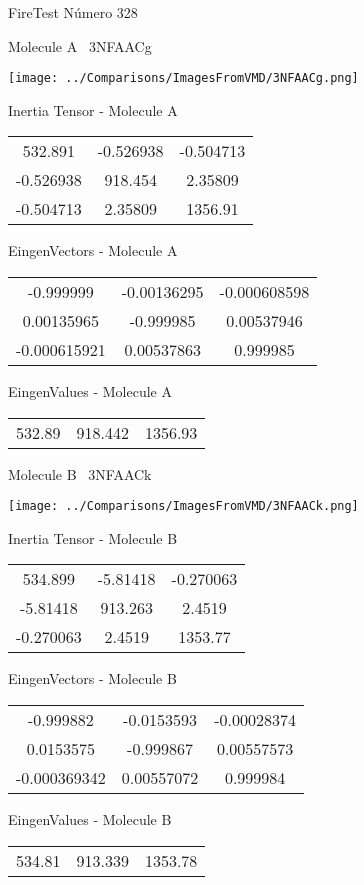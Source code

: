 \vtab[-3cm]
\begin{center}
{\large FireTest \tab Número 328}
\end{center}
\begin{multicols}{2}
\begin{center}

Molecule A \
3NFAACg

\texttt{[image: ../Comparisons/ImagesFromVMD/3NFAACg.png]}

Inertia Tensor - Molecule A \\
\begin{tabular}{|c c c|}
532.891	 & 	-0.526938	 & 	-0.504713	 \\
-0.526938	 & 	918.454	 & 	2.35809	 \\
-0.504713	 & 	2.35809	 & 	1356.91
\end{tabular}

\vtab
 EingenVectors - Molecule A     \\
\begin{tabular}{|c c c|}
-0.999999	 & 	-0.00136295	 & 	-0.000608598	 \\
0.00135965	 & 	-0.999985	 & 	0.00537946	 \\
-0.000615921	 & 	0.00537863	 & 	0.999985
\end{tabular}

\vtab
 EingenValues - Molecule A     \\
\begin{tabular}{|c c c|}
532.89	 & 	918.442	 & 	1356.93	 \\
\end{tabular}
\columnbreak

Molecule B \
3NFAACk

\texttt{[image: ../Comparisons/ImagesFromVMD/3NFAACk.png]}

Inertia Tensor - Molecule B \\
\begin{tabular}{|c c c|}
534.899	 & 	-5.81418	 & 	-0.270063	 \\
-5.81418	 & 	913.263	 & 	2.4519	 \\
-0.270063	 & 	2.4519	 & 	1353.77
\end{tabular}

\vtab
 EingenVectors - Molecule B     \\
\begin{tabular}{|c c c|}
-0.999882	 & 	-0.0153593	 & 	-0.00028374	 \\
0.0153575	 & 	-0.999867	 & 	0.00557573	 \\
-0.000369342	 & 	0.00557072	 & 	0.999984
\end{tabular}

\vtab
 EingenValues - Molecule B     \\
\begin{tabular}{|c c c|}
534.81	 & 	913.339	 & 	1353.78	 \\
\end{tabular}

\end{center}
\end{multicols}

